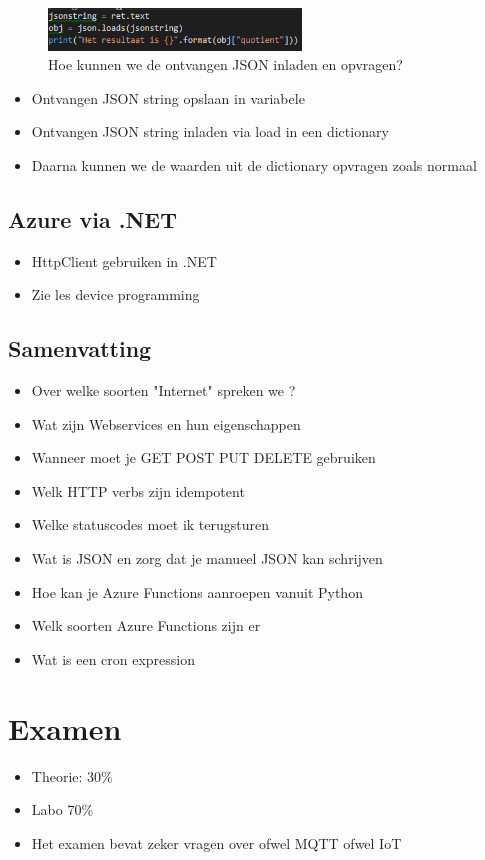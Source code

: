 \documentclass{article}
\begin{document}
\begin{figure}[H]
    \centering
    \includegraphics[width=0.6\textwidth]{rpi-response2-2.png}
    \caption{Hoe kunnen we de ontvangen JSON inladen en opvragen?}
\end{figure}

\begin{itemize}
    \item Ontvangen JSON string opslaan in variabele
    \item Ontvangen JSON string inladen via load in een dictionary
    \item Daarna kunnen we de waarden uit de dictionary opvragen zoals normaal
\end{itemize}

\subsection{Azure via .NET}
\begin{itemize}
    \item HttpClient gebruiken in .NET
    \item Zie les device programming
\end{itemize}


\subsection{Samenvatting}
\begin{itemize}
    \item Over welke soorten "Internet" spreken we ?
    \item Wat zijn Webservices en hun eigenschappen
    \item Wanneer moet je GET POST PUT DELETE gebruiken
    \item Welk HTTP verbs zijn idempotent
    \item Welke statuscodes moet ik terugsturen
    \item Wat is JSON en zorg dat je manueel JSON kan schrijven
    \item Hoe kan je Azure Functions aanroepen vanuit Python
    \item Welk soorten Azure Functions zijn er
    \item Wat is een cron expression
\end{itemize}


\section{Examen}
\begin{itemize}
    \item Theorie: 30\%
    \item Labo 70\%
    \item Het examen bevat zeker vragen over ofwel MQTT ofwel IoT
\end{itemize}
\end{document}
